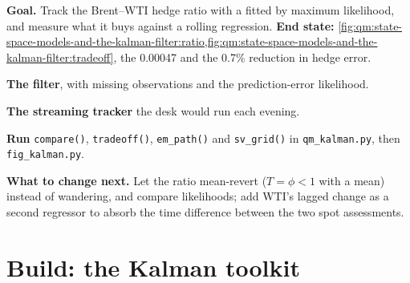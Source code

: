 \begin{tutorial}
\textbf{Goal.} Track the Brent--WTI hedge ratio with a  fitted by maximum likelihood, and measure what it buys against a rolling regression.
\textbf{End state:} \cref{fig:qm:state-space-models-and-the-kalman-filter:ratio,fig:qm:state-space-models-and-the-kalman-filter:tradeoff}, the  0.00047 and the 0.7\% reduction in hedge error.
\begin{tutsteps}
\item \textbf{The filter}, with missing observations and the prediction-error likelihood.
\label{lst:qm:state-space-models-and-the-kalman-filter:kf}
\item \textbf{The streaming tracker} the desk would run each evening.
\label{lst:qm:state-space-models-and-the-kalman-filter:tracker}
\item \textbf{Run} \texttt{compare()}, \texttt{tradeoff()}, \texttt{em\_path()} and \texttt{sv\_grid()} in \texttt{qm\_kalman.py}, then \texttt{fig\_kalman.py}.
\end{tutsteps}
\textbf{What to change next.} Let the ratio mean-revert ($T = \phi < 1$ with a mean) instead of wandering, and compare likelihoods; add WTI's lagged change as a
second regressor to absorb the time difference between the two spot assessments.
\end{tutorial}

\section{Build: the Kalman toolkit}\label{bld:qm:state-space-models-and-the-kalman-filter:kalman}

